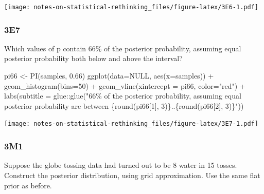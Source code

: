 \documentclass[
]{book}
\newenvironment{Shaded}{\begin{snugshade}}{\end{snugshade}}
\newcommand{\AttributeTok}[1]{\textcolor[rgb]{0.77,0.63,0.00}{#1}}
\newcommand{\ConstantTok}[1]{\textcolor[rgb]{0.00,0.00,0.00}{#1}}
\newcommand{\DecValTok}[1]{\textcolor[rgb]{0.00,0.00,0.81}{#1}}
\newcommand{\FloatTok}[1]{\textcolor[rgb]{0.00,0.00,0.81}{#1}}
\newcommand{\FunctionTok}[1]{\textcolor[rgb]{0.00,0.00,0.00}{#1}}
\newcommand{\NormalTok}[1]{#1}
\newcommand{\OtherTok}[1]{\textcolor[rgb]{0.56,0.35,0.01}{#1}}
\newcommand{\SpecialCharTok}[1]{\textcolor[rgb]{0.00,0.00,0.00}{#1}}
\newcommand{\StringTok}[1]{\textcolor[rgb]{0.31,0.60,0.02}{#1}}
\begin{document}
\texttt{[image: notes-on-statistical-rethinking\_files/figure-latex/3E6-1.pdf]}

\hypertarget{e7}{%
\subsubsection*{3E7}\label{e7}}

Which values of p contain 66\% of the posterior probability, assuming equal posterior probability both below and above the interval?

\begin{Shaded}
\begin{Highlighting}[]
\NormalTok{pi66 }\OtherTok{\textless{}{-}} \FunctionTok{PI}\NormalTok{(samples, }\FloatTok{0.66}\NormalTok{)}
\FunctionTok{ggplot}\NormalTok{(}\AttributeTok{data=}\ConstantTok{NULL}\NormalTok{, }\FunctionTok{aes}\NormalTok{(}\AttributeTok{x=}\NormalTok{samples)) }\SpecialCharTok{+} 
  \FunctionTok{geom\_histogram}\NormalTok{(}\AttributeTok{bins=}\DecValTok{50}\NormalTok{) }\SpecialCharTok{+} 
  \FunctionTok{geom\_vline}\NormalTok{(}\AttributeTok{xintercept =}\NormalTok{ pi66, }\AttributeTok{color=}\StringTok{"red"}\NormalTok{) }\SpecialCharTok{+} 
  \FunctionTok{labs}\NormalTok{(}\AttributeTok{subtitle =}\NormalTok{ glue}\SpecialCharTok{::}\FunctionTok{glue}\NormalTok{(}\StringTok{"66\% of the posterior probability, assuming equal posterior probability are between \{round(pi66[1], 3)\}..\{round(pi66[2], 3)\}"}\NormalTok{))}
\end{Highlighting}
\end{Shaded}

\texttt{[image: notes-on-statistical-rethinking\_files/figure-latex/3E7-1.pdf]}

\hypertarget{m1-1}{%
\subsubsection*{3M1}\label{m1-1}}

Suppose the globe tossing data had turned out to be 8 water in 15 tosses. Construct the posterior distribution, using grid approximation. Use the same flat prior as before.
\end{document}
